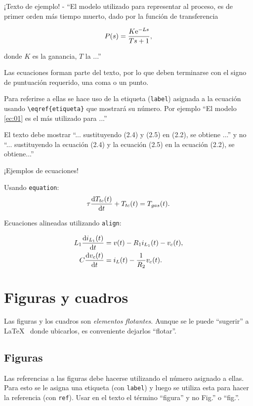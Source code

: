 ¡Texto de ejemplo! - ``El modelo utilizado para representar al proceso, es de primer orden más tiempo muerto, dado por la función de transferencia

\begin{equation}  %
	P(s) = \frac{K \me^{-Ls}}{Ts+1}, \label{ec:01}
\end{equation}

\noindent donde $K$ es la ganancia, $T$ la ...''  

Las ecuaciones forman parte del texto, por lo que deben terminarse con el signo de puntuación requerido, una coma o un punto.

Para referirse a ellas se hace uso de la etiqueta (\texttt{label}) asignada a la ecuación usando \texttt{\textbackslash eqref\{etiqueta\}} que mostrará su número.  Por ejemplo ``El modelo \eqref{ec:01} es el más utilizado para ...''

El texto debe mostrar ``... sustituyendo (2.4) y (2.5) en (2.2), se obtiene ...'' y no ``... sustituyendo la ecuación (2.4) y la ecuación (2.5) en la ecuación (2.2), se obtiene...''  

¡Ejemplos de ecuaciones!

Usando \texttt{equation}:
\begin{equation}
	\tau \frac{\mathrm{d} T_{tc}(t)}{\mathrm{d} t} + T_{tc}(t) = T_{gas}(t).
\end{equation}

Ecuaciones alineadas utilizando \texttt{align}:

\begin{align}
	L_1 \frac{\mathrm{d} i_{L_1} (t)}{\mathrm{d} t} &= v(t) - R_1 i_{L_1}(t) - v_c(t), \\
	C \frac{\mathrm{d} v_c (t)}{\mathrm{d} t} &= i_L(t)- \frac{1}{R_2} v_c(t).
\end{align}

\section{Figuras y cuadros}
Las figuras y los cuadros son \emph{elementos flotantes}. Aunque se le puede ``sugerir'' a \LaTeX~ donde ubicarlos, es conveniente dejarlos ``flotar''.

\subsection{Figuras}
Las referencias a las figuras debe hacerse utilizando el número asignado a ellas.  Para esto se le asigna una etiqueta (con \texttt{label}) y luego se utiliza esta para hacer la referencia (con \texttt{ref}).  Usar en el texto el término ``figura'' y no Fig.'' o ``fig.''.


